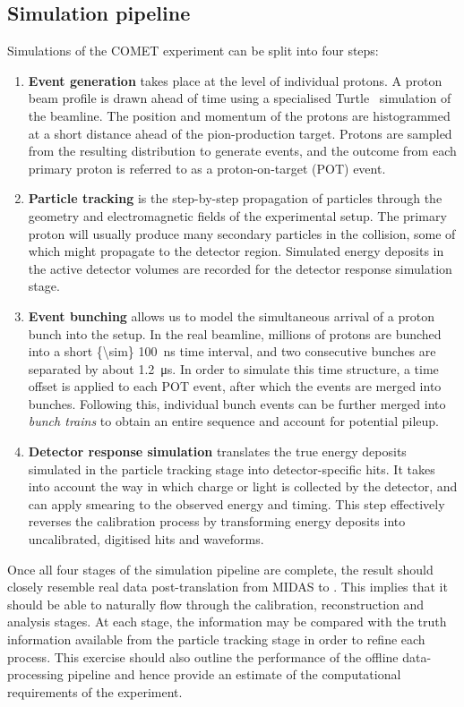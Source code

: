 \subsection{Simulation pipeline}
Simulations of the COMET experiment can be split into four steps:
\begin{enumerate}
    \item {\bf Event generation} takes place at the level of individual protons.
    A proton beam profile is drawn ahead of time using a specialised
    Turtle~\cite{Carey1974DecayT} simulation of the beamline. The position and
    momentum of the protons are histogrammed at a short distance ahead of the
    pion-production target. Protons are sampled from the resulting distribution
    to generate events, and the outcome from each primary proton is referred to
    as a proton-on-target (POT) event.
    \item {\bf Particle tracking} is the step-by-step propagation of particles
    through the geometry and electromagnetic fields of the experimental setup.
    The primary proton will usually produce many secondary particles in the
    collision, some of which might propagate to the detector region. Simulated
    energy deposits in the active detector volumes are recorded for the detector
    response simulation stage.
    \item {\bf Event bunching} allows us to model the simultaneous arrival of a
    proton bunch into the setup. In the real beamline, millions of protons are
    bunched into a short \SI{{\sim} 100}{\ns} time interval, and two consecutive
    bunches are separated by about \SI{1.2}{\micro\second}. In order to simulate
    this time structure, a time offset is applied to each POT event, after which
    the events are merged into bunches. Following this, individual bunch events
    can be further merged into \emph{bunch trains} to obtain an entire sequence
    and account for potential pileup.
    \item {\bf Detector response simulation} translates the true energy deposits
    simulated in the particle tracking stage into detector-specific hits. It
    takes into account the way in which charge or light is collected by the
    detector, and can apply smearing to the observed energy and timing. This
    step effectively reverses the calibration process by transforming energy
    deposits into uncalibrated, digitised hits and waveforms.
\end{enumerate}

Once all four stages of the simulation pipeline are complete, the result should
closely resemble real data post-translation from MIDAS to \oaEvent. This implies
that it should be able to naturally flow through the calibration, reconstruction
and analysis stages. At each stage, the information may be compared with the
truth information available from the particle tracking stage in order to refine
each process. This exercise should also outline the performance of the offline
data-processing pipeline and hence provide an estimate of the computational
requirements of the experiment.


